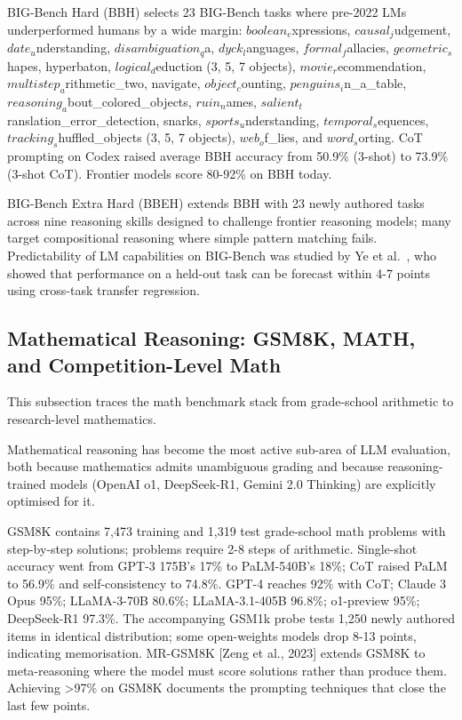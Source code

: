 \documentclass{article}
\begin{document}
BIG-Bench Hard (BBH) \cite{suzgun2022challengingbigbenc} selects 23 BIG-Bench tasks where pre-2022 LMs underperformed humans by a wide margin: \(boolean_e\)xpressions, \(causal_j\)udgement, \(date_u\)nderstanding, \(disambiguation_q\)a, \(dyck_l\)anguages, \(formal_f\)allacies, \(geometric_s\)hapes, hyperbaton, \(logical_d\)eduction (3, 5, 7 objects), \(movie_r\)ecommendation, \(multistep_a\)rithmetic\_two, navigate, \(object_c\)ounting, \(penguins_i\)n\_a\_table, \(reasoning_a\)bout\_colored\_objects, \(ruin_n\)ames, \(salient_t\)ranslation\_error\_detection, snarks, \(sports_u\)nderstanding, \(temporal_s\)equences, \(tracking_s\)huffled\_objects (3, 5, 7 objects), \(web_o\)f\_lies, and \(word_s\)orting. CoT prompting on Codex raised average BBH accuracy from 50.9\% (3-shot) to 73.9\% (3-shot CoT). Frontier models score 80-92\% on BBH today.

BIG-Bench Extra Hard (BBEH) \cite{kazemi20252025} extends BBH with 23 newly authored tasks across nine reasoning skills designed to challenge frontier reasoning models; many target compositional reasoning where simple pattern matching fails. Predictability of LM capabilities on BIG-Bench was studied by Ye et al.~\cite{ye2023howpredictablearel}, who showed that performance on a held-out task can be forecast within 4-7 points using cross-task transfer regression.

\subsection{Mathematical Reasoning: GSM8K, MATH, and Competition-Level Math}\label{mathematical-reasoning-gsm8k-math-and-competition-level-math}

This subsection traces the math benchmark stack from grade-school arithmetic to research-level mathematics.

Mathematical reasoning has become the most active sub-area of LLM evaluation, both because mathematics admits unambiguous grading and because reasoning-trained models (OpenAI o1, DeepSeek-R1, Gemini 2.0 Thinking) are explicitly optimised for it.

GSM8K \cite{cobbe20212021} contains 7,473 training and 1,319 test grade-school math problems with step-by-step solutions; problems require 2-8 steps of arithmetic. Single-shot accuracy went from GPT-3 175B's 17\% to PaLM-540B's 18\%; CoT raised PaLM to 56.9\% and self-consistency to 74.8\%. GPT-4 reaches 92\% with CoT; Claude 3 Opus 95\%; LLaMA-3-70B 80.6\%; LLaMA-3.1-405B 96.8\%; o1-preview 95\%; DeepSeek-R1 97.3\%. The accompanying GSM1k probe \cite{zhang20242024} tests 1,250 newly authored items in identical distribution; some open-weights models drop 8-13 points, indicating memorisation. MR-GSM8K {[}Zeng et al., 2023{]} extends GSM8K to meta-reasoning where the model must score solutions rather than produce them. Achieving \textgreater97\% on GSM8K \cite{zhong2024agievalahumancentr} documents the prompting techniques that close the last few points.
\end{document}
